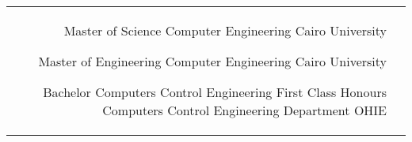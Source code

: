 \documentclass[10pt]{article} %
\begin{document}
\begin{paracol}{2}


\begin{supertabular}{rl} %

	
	{Master of Science} %
	{} %
	{Computer Engineering} %
	{Cairo University} %
	
	
	{Master of Engineering} %
	{} %
	{Computer Engineering} %
	{Cairo University} %
	
	
	{Bachelor Computers Control Engineering} %
	{First Class Honours} %
	{ Computers Control Engineering Department} %
	{OHIE} %
	

\end{supertabular}


%
%
%
%
%
%	
%	
%	
%	
%	
%	


\end{paracol}
\end{document}
